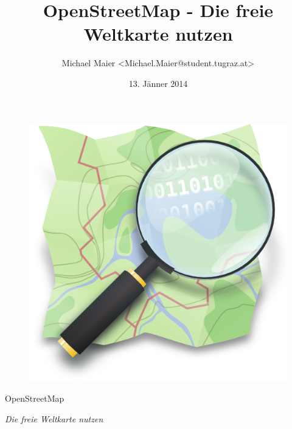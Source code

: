 \documentclass[handout]{beamer}
\title{OpenStreetMap - Die freie Weltkarte nutzen}
\author{Michael Maier \textless Michael.Maier@student.tugraz.at\textgreater}
\date{13. Jänner 2014}
\begin{document}

\begin{frame} 


\begin{figure}
  \centering
  \includegraphics[width=.5\textwidth]{mag_map.png}
\end{figure}

\begin{center}
\Huge{OpenStreetMap\\}
\end{center}

\begin{center}
\Large{\emph{Die freie Weltkarte nutzen}}
\end{center}

\end{frame}



%

%
\end{document}
